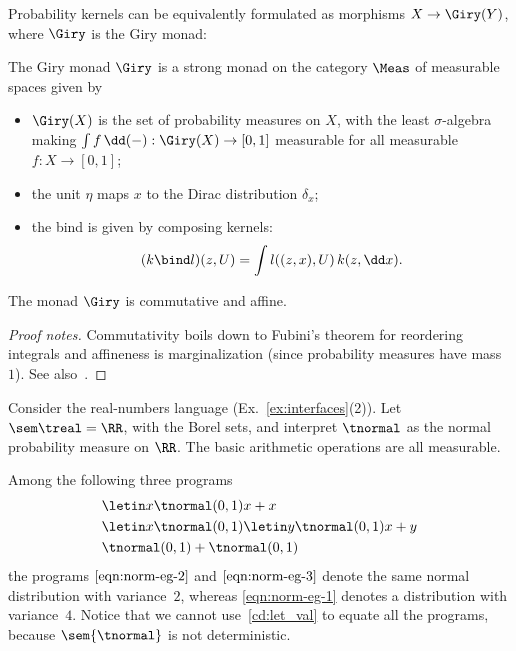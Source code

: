 
Probability kernels can be equivalently formulated as morphisms $X\to \Giry (Y)$, where $\Giry$ is the Giry monad:
\begin{definition}\label{def:giry}
  The Giry monad $\Giry$ is a strong monad on the category $\Meas$ of measurable spaces given by
  \begin{itemize}
\item  $\Giry(X)$ is the set of probability measures on $X$, with the least $\sigma$-algebra making $\int f\, \dd(-):\Giry(X)\to [0,1]$ measurable for all measurable $f:X\to [0,1]$;
\item the unit $\eta$ maps $x$ to the Dirac distribution $\delta_x$;
\item the bind is given by composing kernels:
  \begin{equation}
  (k\bind l) (z,U) = \int l((z,x),U) \, k(z,\dd x)\text.
  \end{equation}
  \end{itemize}
\end{definition}
\begin{proposition}\label{prop:giry-comm}
  The monad $\Giry$ is commutative and affine.
\end{proposition}
\begin{proof}[Proof notes] Commutativity boils down to Fubini's theorem for reordering integrals and affineness is marginalization (since probability measures have mass $1$). See also~\cite{jacobs-commutative-effectus}.\end{proof}

\label{giry-real-lang}
Consider the real-numbers language (Ex.~\ref{ex:interfaces}(2)).
Let $\sem \treal=\RR$, with the Borel sets, and interpret $\tnormal$ as the normal probability measure on $\RR$. The basic arithmetic operations are all measurable.

Among the following three programs
  \begin{align}
    &\letin x {\tnormal(0,1)} {x+x} \label{eqn:norm-eg-1}\\
    &\letin x {\tnormal(0,1)} {\letin y {\tnormal(0,1)} {x+y} }\label{eqn:norm-eg-2}\\
    &\tnormal(0,1)+\tnormal(0,1) \label{eqn:norm-eg-3}\end{align}
  the programs $\eqref{eqn:norm-eg-2}$ and $\eqref{eqn:norm-eg-3}$
  denote the same normal distribution with variance~$2$, whereas
  \eqref{eqn:norm-eg-1} denotes a distribution with variance~$4$.
  Notice that we cannot use~\eqref{cd:let_val} to equate all the
  programs, because $\sem{\tnormal}$ is not deterministic.

